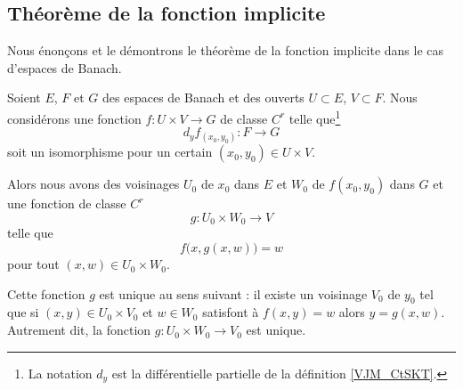 \subsection{Théorème de la fonction implicite}


Nous énonçons et le démontrons le théorème de la fonction implicite dans le cas d'espaces de Banach.
\begin{theorem} \label{ThoAcaWho}
    Soient \( E\), \( F\) et \( G\) des espaces de Banach et des ouverts \( U\subset E\), \( V\subset F\). Nous considérons une fonction \( f\colon U\times V\to G\) de classe \( C^r\) telle que\footnote{La notation \( d_y\) est la différentielle partielle de la définition \ref{VJM_CtSKT}.}
    \begin{equation}
        d_yf_{(x_0,y_0)}\colon F\to G
    \end{equation}
    soit un isomorphisme pour un certain \( (x_0,y_0)\in U\times V\).

    Alors nous avons des voisinages \( U_0\) de \( x_0\) dans \( E\) et \( W_0\) de \( f(x_0,y_0)\) dans \( G\) et une fonction de classe \( C^r\) 
    \begin{equation}
        g\colon U_0\times W_0\to V
    \end{equation}
    telle que 
    \begin{equation}
        f\big( x,g(x,w) \big)=w
    \end{equation}
    pour tout \( (x,w)\in U_0\times W_0\).
    
    Cette fonction \( g\) est unique au sens suivant : il existe un voisinage \( V_0 \) de \( y_0\) tel que si \( (x,y)\in U_0\times V_0\) et \( w\in W_0\) satisfont à \( f(x,y)=w\) alors \( y=g(x,w)\). Autrement dit, la fonction \( g\colon U_0\times W_0\to V_0\) est unique.
\end{theorem}

